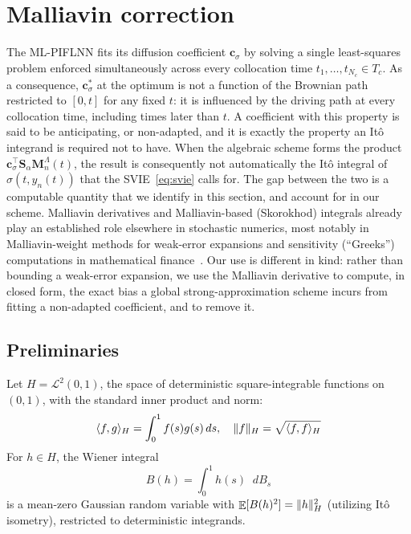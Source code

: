 \documentclass[11pt, a4paper]{article}
\theoremstyle{theoremstyle}
\theoremstyle{definitionstyle}
\newcommand{\dd}{\mathop{}\!d}
\DeclareMathOperator{\EE}{\mathbb E}
\DeclarePairedDelimiter{\norm}{\lVert}{\rVert}
\DeclarePairedDelimiter{\ip}{\langle}{\rangle}
\begin{document}
\section{Malliavin correction}\label{sec:malliavin}
The ML-PIFLNN fits its diffusion coefficient $\mathbf c_\sigma$ by solving a single least-squares problem enforced simultaneously across every collocation time $t_1,\dots,t_{N_c}\in T_c$. As a consequence, $\mathbf c_\sigma^*$ at the optimum is not a function of the Brownian path restricted to $[0,t]$ for any fixed $t$: it is influenced by the driving path at every collocation time, including times later than $t$. A coefficient with this property is said to be anticipating, or non-adapted, and it is exactly the property an It\^o integrand is required not to have. When the algebraic scheme forms the product $\mathbf c_\sigma^\top\mathbf S_\alpha\mathbf M_n^\Lambda(t)$, the result is consequently not automatically the It\^o integral of $\sigma(t,y_n(t))$ that the SVIE~\eqref{eq:svie} calls for. The gap between the two is a computable quantity that we identify in this section, and account for in our scheme. Malliavin derivatives and Malliavin-based (Skorokhod) integrals already play an established role elsewhere in stochastic numerics, most notably in Malliavin-weight methods for weak-error expansions and sensitivity (``Greeks'') computations in mathematical finance~\cite{fournieetal1999,ballytalay1996,kohatsuhiga2001}. Our use is different in kind: rather than bounding a weak-error expansion, we use the Malliavin derivative to compute, in closed form, the exact bias a global strong-approximation scheme incurs from fitting a non-adapted coefficient, and to remove it.

\subsection{Preliminaries}\label{sec:malliavin_prelim}
Let $H = \mathcal L^2(0,1)$, the space of deterministic square-integrable functions on $(0,1)$, with the standard inner product and norm:
\begin{equation}
    \ip{f, g}_H = \int_0^1 f(s)g(s)\dd{s}, \quad \norm{f}_H = \sqrt{\ip{f, f}_H}
\end{equation}
For $h\in H$, the Wiener integral
\begin{equation}
    B(h)=\int_0^1h(s)\dd{B_s}
\end{equation}
is a mean-zero Gaussian random variable with $\EE[B(h)^2]=\norm{h}_H^2$ (utilizing It\^o isometry), restricted to deterministic integrands.
\end{document}
